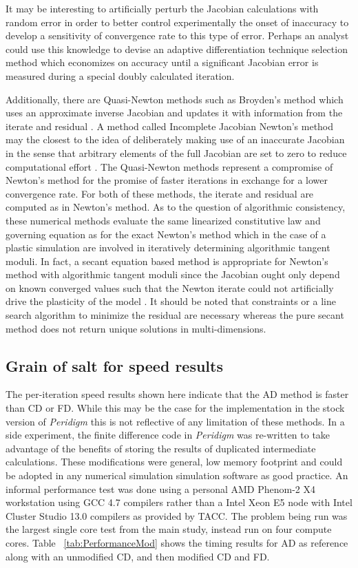 \documentclass[preprint,12pt]{elsarticle}
\begin{document}
It may be interesting to artificially perturb the Jacobian calculations with
random error in order to better control experimentally the onset of inaccuracy
to develop a sensitivity of convergence rate to this type of error. Perhaps an
analyst could use this knowledge to devise an adaptive differentiation
technique selection method which economizes on accuracy until a significant
Jacobian error is measured during a special doubly calculated iteration.

Additionally, there are Quasi-Newton methods such as Broyden's method which
uses an approximate inverse Jacobian and updates it with information from the 
iterate and residual \cite{dennis1971convergence}. A method called
Incomplete Jacobian Newton's method may the closest to the idea of deliberately
making use of an inaccurate Jacobian in the sense that arbitrary elements of
the full Jacobian are set to zero to reduce computational effort
\cite{liu2008incomplete}. The Quasi-Newton methods represent a compromise of
Newton's method for the promise of faster iterations in exchange for a lower
convergence rate. For both of these methods, the iterate and residual are
computed as in Newton's method. As to the question of algorithmic consistency,
these numerical methods evaluate the same linearized constitutive law and
governing equation as for the exact Newton's method which in the case of a
plastic simulation are involved in iteratively determining algorithmic tangent moduli. 
In fact, a secant equation based method is appropriate for Newton's method with algorithmic
tangent moduli since the Jacobian ought only depend on known converged
values such that the Newton iterate could not artificially drive the plasticity
of the model \cite[Chap. 6]{belytschko1999nonlinear}. It should be noted that
constraints or a line search algorithm to minimize the residual are necessary
whereas the pure secant method does not return unique solutions in
multi-dimensions.
%

\subsection{Grain of salt for speed results}
The per-iteration speed results shown here indicate that the AD method is
faster than CD or FD.  While this may be the case for the implementation in the
stock version of \emph{Peridigm} this is not reflective of any limitation of
these methods. In a side experiment, the finite difference code in
\emph{Peridigm} was re-written to take advantage of the benefits of storing the
results of duplicated intermediate calculations. These modifications were 
general, low memory footprint and could be adopted in any numerical simulation
simulation software as good practice. An informal performance test was done
using a personal AMD Phenom-2 X4 workstation using GCC 4.7 compilers rather than a
Intel Xeon E5 node with Intel Cluster Studio 13.0 compilers as provided by TACC. The problem
being run was the largest single core test from the main study, instead run on four 
compute cores. Table ~\ref{tab:PerformanceMod} shows the timing
results for AD as reference along with an unmodified CD, and then modified CD
and FD.
\end{document}
